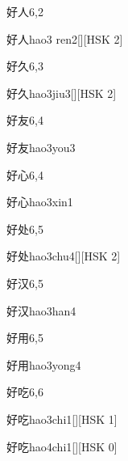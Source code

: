 \begin{entry}{好人}{6,2}
  \begin{phonetics}{好人}{hao3 ren2}[][HSK 2]
  \end{phonetics}
\end{entry}

\begin{entry}{好久}{6,3}
  \begin{phonetics}{好久}{hao3jiu3}[][HSK 2]
  \end{phonetics}
\end{entry}

\begin{entry}{好友}{6,4}
  \begin{phonetics}{好友}{hao3you3}
  \end{phonetics}
\end{entry}

\begin{entry}{好心}{6,4}
  \begin{phonetics}{好心}{hao3xin1}
  \end{phonetics}
\end{entry}

\begin{entry}{好处}{6,5}
  \begin{phonetics}{好处}{hao3chu4}[][HSK 2]
  \end{phonetics}
\end{entry}

\begin{entry}{好汉}{6,5}
  \begin{phonetics}{好汉}{hao3han4}
  \end{phonetics}
\end{entry}

\begin{entry}{好用}{6,5}
  \begin{phonetics}{好用}{hao3yong4}
  \end{phonetics}
\end{entry}

\begin{entry}{好吃}{6,6}
  \begin{phonetics}{好吃}{hao3chi1}[][HSK 1]
  \end{phonetics}
  \begin{phonetics}{好吃}{hao4chi1}[][HSK 0]
  \end{phonetics}
\end{entry}

